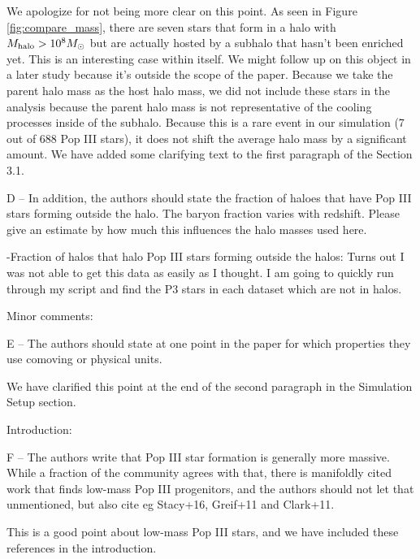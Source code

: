 \documentclass[11pt]{article}
\newenvironment{referee}[1][]{%
    \ignorespaces%
    \begin{mdframed}[style=myquotestyle,#1]%
}{%
    \end{mdframed}%
    \ignorespacesafterend%
}%
\begin{document}
We apologize for not being more clear on this point.  As seen in Figure \ref{fig:compare_mass}, there are seven stars that form in a halo with $M_{\rm halo} > 10^8 M_\odot$ but are actually hosted by a subhalo that hasn't been enriched yet.  This is an interesting case within itself.  We might follow up on this object in a later study because it's outside the scope of the paper.  Because we take the parent halo mass as the host halo mass, we did not include these stars in the analysis because the parent halo mass is not representative of the cooling processes inside of the subhalo.  Because this is a rare event in our simulation (7 out of 688 Pop III stars), it does not shift the average halo mass by a significant amount.  We have added some clarifying text to the first paragraph of the Section 3.1.

\begin{referee}
D -- In addition, the authors should state the fraction of haloes that have Pop III stars forming outside the halo. The baryon fraction varies with redshift. Please give an estimate by how much this influences the halo masses used here.
\end{referee}

-Fraction of halos that halo Pop III stars forming outside the halos: Turns out I was not able to get this data as easily as I thought. I am going to quickly run through my script and find the P3 stars in each dataset which are not in halos.

\begin{referee}
Minor comments:

E -- The authors should state at one point in the paper for which properties they use comoving or physical units.
\end{referee}
We have clarified this point at the end of the second paragraph in the Simulation Setup section.

\begin{referee}
Introduction:

F -- The authors write that Pop III star formation is generally more massive. While a fraction of the community agrees with that, there is manifoldly cited work that finds low-mass Pop III progenitors, and the authors should not let that unmentioned, but also cite eg Stacy+16, Greif+11 and Clark+11.
\end{referee}

This is a good point about low-mass Pop III stars, and we have included these references in the introduction.
\end{document}
